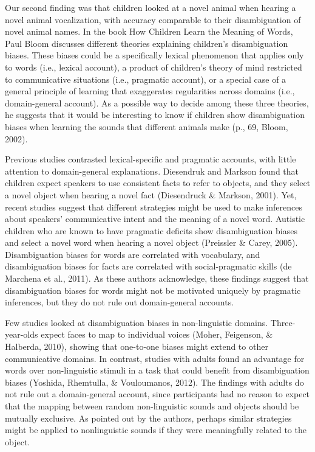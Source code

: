\documentclass[english,floatsintext,man]{apa6}
\newcounter{author}
\theoremstyle{definition}
\theoremstyle{definition}
\theoremstyle{definition}
\theoremstyle{remark}
\begin{document}
Our second finding was that children looked at a novel animal when
hearing a novel animal vocalization, with accuracy comparable to their
disambiguation of novel animal names. In the book How Children Learn the
Meaning of Words, Paul Bloom discusses different theories explaining
children's disambiguation biases. These biases could be a specifically
lexical phenomenon that applies only to words (i.e., lexical account), a
product of children's theory of mind restricted to communicative
situations (i.e., pragmatic account), or a special case of a general
principle of learning that exaggerates regularities across domains
(i.e., domain-general account). As a possible way to decide among these
three theories, he suggests that it would be interesting to know if
children show disambiguation biases when learning the sounds that
different animals make (p., 69, Bloom, 2002).

Previous studies contrasted lexical-specific and pragmatic accounts,
with little attention to domain-general explanations. Diesendruk and
Markson found that children expect speakers to use consistent facts to
refer to objects, and they select a novel object when hearing a novel
fact (Diesendruck \& Markson, 2001). Yet, recent studies suggest that
different strategies might be used to make inferences about speakers'
communicative intent and the meaning of a novel word. Autistic children
who are known to have pragmatic deficits show disambiguation biases and
select a novel word when hearing a novel object (Preissler \& Carey,
2005). Disambiguation biases for words are correlated with vocabulary,
and disambiguation biases for facts are correlated with social-pragmatic
skills (de Marchena et al., 2011). As these authors acknowledge, these
findings suggest that disambiguation biases for words might not be
motivated uniquely by pragmatic inferences, but they do not rule out
domain-general accounts.

Few studies looked at disambiguation biases in non-linguistic domains.
Three-year-olds expect faces to map to individual voices (Moher,
Feigenson, \& Halberda, 2010), showing that one-to-one biases might
extend to other communicative domains. In contrast, studies with adults
found an advantage for words over non-linguistic stimuli in a task that
could benefit from disambiguation biases (Yoshida, Rhemtulla, \&
Vouloumanos, 2012). The findings with adults do not rule out a
domain-general account, since participants had no reason to expect that
the mapping between random non-linguistic sounds and objects should be
mutually exclusive. As pointed out by the authors, perhaps similar
strategies might be applied to nonlinguistic sounds if they were
meaningfully related to the object.
\end{document}

